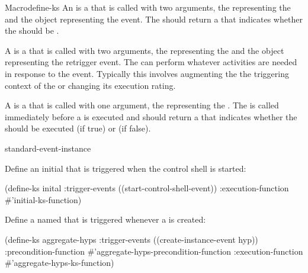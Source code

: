 \documentclass[10pt,twoside,english,pdftex]{article}
\begin{document}
\begin{functiondoc}{Macro}{define-ks}
An  is a  that is called with two
arguments, the  representing the  and the
object representing the  event.  The 
should return a  that indicates whether the
 should be .

A  is a  that is called with
two arguments, the  representing the 
and the object representing the retrigger event.  The
 can perform whatever activities are needed
in response to the event.  Typically this involves augmenting the the
triggering context of the  or changing its execution rating.

A  is a  that is called with one
argument, the  representing the .  The
 is called immediately before a  is
executed and should return a  that indicates
whether the  should be executed (if true) or  (if
false).

\begin{alsos}{standard-event-instance}
\also[describe-ks]
\also[ensure-ks]
\also[ks]
\also[ks-enabled-p]
\also[undefine-ks]
\end{alsos}

\fnexamples
Define an initial  that is triggered when the control shell is started:
\begin{example}
  (define-ks inital
     :trigger-events ((start-control-shell-event)) 
     :execution-function #'initial-ks-function)
\end{example}

Define a  named  that is triggered whenever a
  is created:
\begin{example}
  (define-ks aggregate-hyps
     :trigger-events ((create-instance-event hyp))
     :precondition-function #'aggregate-hyps-precondition-function
     :execution-function #'aggregate-hyps-ks-function)
\end{example}

\fnnotes
\instancekstriggersnyi

\end{functiondoc}
\end{document}
